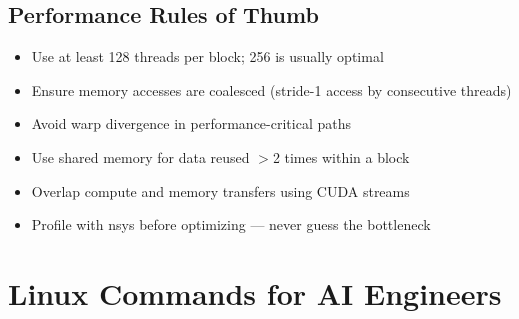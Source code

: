 \documentclass[11pt, twoside, openright]{book}
\begin{document}
\section*{Performance Rules of Thumb}

\begin{itemize}
  \item Use at least 128 threads per block; 256 is usually optimal
  \item Ensure memory accesses are coalesced (stride-1 access by consecutive threads)
  \item Avoid warp divergence in performance-critical paths
  \item Use shared memory for data reused $>$2 times within a block
  \item Overlap compute and memory transfers using CUDA streams
  \item Profile with nsys before optimizing --- never guess the bottleneck
\end{itemize}

\chapter{Linux Commands for AI Engineers}
\label{app:linux}
\end{document}
